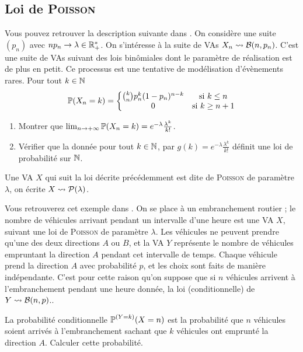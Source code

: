 \documentclass[11pt, a4paper]{article}
\begin{document}
\subsection{Loi de \textsc{Poisson}}
\label{sec:loidepoisson}

Vous pouvez retrouver la description suivante dans
\cite{aleaprobasIX}. On considère une suite $(p_n)$ avec
$np_n \to \lambda \in \mathbb{R}_+^*$. On s'intéresse à la suite de VAs
$X_n \leadsto \mathcal{B}(n, p_n)$. C'est une suite de VAs suivant des lois
binômiales dont le paramètre de réalisation est de plus en petit. Ce
processus est une tentative de modélisation d'évènements rares. Pour
tout $ k \in \mathbb{N}$
\[
  \operatorname{\mathbb{P}}(X_n = k) = \left\{
    \begin{matrix}
      \binom{k}{n}p_n^k(1-p_n)^{n-k} & \textrm{si $k \leq n$} \\
      0 & \textrm{si $k \geq n+1$}
    \end{matrix}\right.
\]
\begin{question}
  \begin{enumerate}
  \item Montrer que
    $\lim_{n \to +\infty} \operatorname{\mathbb{P}}(X_n = k) =
    e^{-\lambda}\frac{\lambda^k}{k!}$.
  \item Vérifier que la donnée pour tout $k \in \mathbb{N}$, par
    $g(k) = e^{-\lambda}\frac{\lambda^k}{k!}$ définit une loi de
    probabilité sur $\mathbb{N}$.
  \end{enumerate}
\end{question}
Une VA $X$ qui suit la loi décrite précédemment est dite de
\textsc{Poisson} de paramètre $\lambda$, on écrite
$X \leadsto \mathcal{P}(\lambda)$.
\begin{question}
  Vous retrouverez cet exemple dans \cite[page
  94]{ouvrard1998probabilites}. On se place à un embranchement routier
  ; le nombre de véhicules arrivant pendant un intervalle d'une heure
  est une VA $X$, suivant une loi de \textsc{Poisson} de paramètre
  $\lambda$. Les véhicules ne peuvent prendre qu'une des deux
  directions $A$ ou $B$, et la VA $Y$ représente le nombre de
  véhicules empruntant la direction $A$ pendant cet intervalle de
  temps. Chaque véhicule prend la direction $A$ avec probabilité $p$,
  et les choix sont faits de manière indépendante. C'est pour cette
  raison qu'on suppose que si $n$ véhicules arrivent à l'embranchement
  pendant une heure donnée, la loi (conditionnelle) de
  $Y \leadsto \mathcal{B}(n, p)$..

  La probabilité conditionnelle $\operatorname{\mathbb{P}}^{(Y = k)}(X = n)$ est la
  probabilité que $n$ véhicules soient arrivés à l'embranchement
  sachant que $k$ véhicules ont emprunté la direction $A$. Calculer
  cette probabilité.
\end{question}
\end{document}
